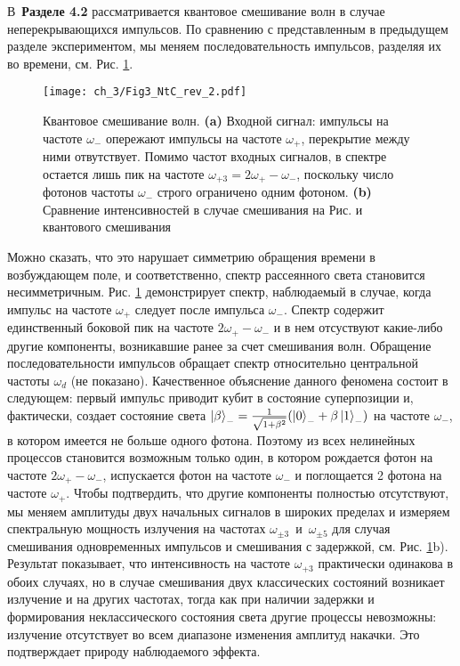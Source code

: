 В~\textbf{Разделе 4.2} рассматривается квантовое смешивание волн в случае неперекрывающихся импульсов. По сравнению с представленным в предыдущем разделе экспериментом, мы меняем последовательность импульсов, разделяя их во времени, см. Рис. \ref{fig: qwm}.
\begin{figure}[htb]\center
	\texttt{[image: ch\_3/Fig3\_NtC\_rev\_2.pdf]}
	\caption{Квантовое смешивание волн. \textbf{(a)} Входной сигнал: импульсы на частоте $\omega_{-}$ опережают импульсы на частоте $\omega_+$, перекрытие между ними отвутствует. Помимо частот входных сигналов, в спектре остается лишь пик на частоте $\omega_{+3}=2\omega_+-\omega_-$, поскольку число фотонов частоты $\omega_-$ строго ограничено одним фотоном. \textbf{(b)} Сравнение интенсивностей в случае смешивания на Рис.  и квантового смешивания}
	\label{fig: qwm}	
\end{figure}
Можно сказать, что это нарушает симметрию обращения времени в возбуждающем поле, и соответственно, спектр рассеянного света становится несимметричным. Рис. \ref{fig: qwm} демонстрирует спектр, наблюдаемый в случае, когда импульс на частоте $\omega_+$ следует после импульса $\omega_-$. Спектр содержит единственный боковой пик на частоте $2\omega_+-\omega_-$ и в нем отсуствуют какие-либо другие компоненты, возникавшие ранее за счет смешивания волн. Обращение последовательности импульсов обращает спектр относительно центральной частоты $\omega_d$ (не показано). Качественное объяснение данного феномена состоит в следующем: первый импульс приводит кубит в состояние суперпозиции и, фактически, создает состояние света $\ket{\beta}_- = \frac{1}{\sqrt{1+\beta^2}}(\ket{0}_-+\beta\ket{1}_-)$ на частоте $\omega_-$, в котором имеется не больше одного фотона. Поэтому из всех нелинейных процессов становится возможным только один, в котором рождается фотон на частоте $2\omega_+-\omega_-$, испускается фотон на частоте $\omega_-$ и поглощается 2 фотона на частоте $\omega_+$. Чтобы подтвердить, что другие компоненты полностью отсутствуют, мы меняем амплитуды двух начальных сигналов в широких пределах и измеряем спектральную мощность излучения на частотах $\omega_{\pm3}$~и~$ \omega_{\pm5}$ для случая смешивания одновременных импульсов и смешивания с задержкой, см. Рис. \ref{fig: qwm}b). Результат показывает, что интенсивность на частоте $\omega_{+3}$ практически одинакова в обоих случаях, но в случае смешивания двух классических состояний возникает излучение и на других частотах, тогда как при наличии задержки и формирования неклассического состояния света другие процессы невозможны: излучение отсутствует во всем диапазоне изменения амплитуд накачки. Это подтверждает природу наблюдаемого эффекта. 
